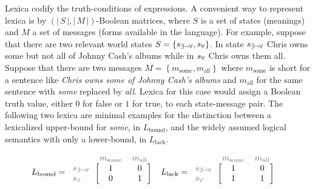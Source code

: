 \documentclass[a4paper, 11pt]{article}
\theoremstyle{Satz}
\newcommand{\set}[1]{\left\{#1\right\}}
\newcommand{\card}[1]{\left \lvert \, #1 \, \right\rvert}
\newcommand{\States}{\ensuremath{S}\xspace}		%
\newcommand{\state}{\ensuremath{s}\xspace}		%
\newcommand{\mystate}[1]{\ensuremath{\state_{\text{#1}}}\xspace} %
\newcommand{\mylang}[1]{\ensuremath{L_{\text{#1}}}\xspace} %
\newcommand{\Messgs}{\ensuremath{M}\xspace}		%
\newcommand{\messg}{\ensuremath{m}\xspace}		%
\newcommand{\mymessg}[1]{\ensuremath{\messg_{\text{#1}}}\xspace} %
\newcommand{\ssome}{\mystate{\ensuremath{\exists\neg\forall}}}
\newcommand{\sall}{\mystate{\ensuremath{\forall}}}
\newcommand{\msome}{\mymessg{some}}
\newcommand{\mall}{\mymessg{all}}
\newcommand{\Lbound}{\mylang{bound}}
\newcommand{\Llack}{\mylang{lack}}
\newcommand{\mygray}[1]{{\textcolor{mygray}{#1}}}
\begin{document}
Lexica codify the truth-conditions of expressions. A convenient way to represent lexica is by
$(\card{\States}, \card{\Messgs})$-Boolean matrices, where $\States$ is a set of states
(meanings) and $M$ a set of messages (forms available in the language). For example, suppose
that there are two relevant world states $\States = \set{\ssome, \sall}$. In state $\ssome$
Chris owns some but not all of Johnny Cash's albums while in $\sall$ Chris owns them
all. Suppose that there are two messages $\Messgs = \set{\msome, \mall}$ where $\msome$ is
short for a sentence like \emph{Chris owns some of Johnny Cash's albums} and $\mall$ for the
same sentence with \emph{some} replaced by \emph{all}.  Lexica for this case would assign a
Boolean truth value, either $0$ for false or $1$ for true, to each state-message pair. The
following two lexica are minimal examples for the distinction between a lexicalized upper-bound
for \emph{some}, in $\Lbound$, and the widely assumed logical semantics with only a lower-bound,
in $\Llack$.

\begin{align*}
  \Lbound & = \begin{blockarray}{lcc}
    & \mygray{\msome} & \mygray{\mall} \\
    \begin{block}{l[cc]}
      \mygray{\ssome} & 1 & 0 \\
      \mygray{\sall}  & 0 & 1 \\
    \end{block}
  \end{blockarray} &
  \Llack & = \begin{blockarray}{lcc}
    & \mygray{\msome} & \mygray{\mall} \\
    \begin{block}{l[cc]}
      \mygray{\ssome} & 1 & 0 \\
      \mygray{\sall}  & 1 & 1 \\
    \end{block}
  \end{blockarray}
\end{align*}
\end{document}
